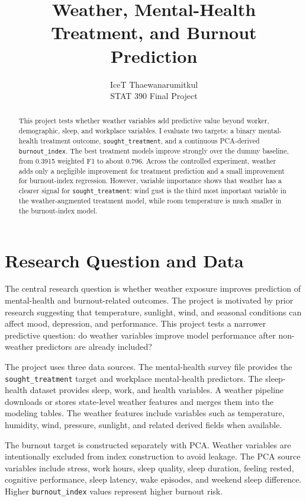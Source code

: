 \documentclass[10pt]{article}
\title{Weather, Mental-Health Treatment, and Burnout Prediction}
\author{IceT Thaewanarumitkul \\ STAT 390 Final Project}
\date{}
\begin{document}
\maketitle

\begin{abstract}
This project tests whether weather variables add predictive value beyond worker, demographic, sleep, and workplace variables. I evaluate two targets: a binary mental-health treatment outcome, \texttt{sought\_treatment}, and a continuous PCA-derived \texttt{burnout\_index}. The best treatment models improve strongly over the dummy baseline, from 0.3915 weighted F1 to about 0.796. Across the controlled experiment, weather adds only a negligible improvement for treatment prediction and a small improvement for burnout-index regression. However, variable importance shows that weather has a clearer signal for \texttt{sought\_treatment}: wind gust is the third most important variable in the weather-augmented treatment model, while room temperature is much smaller in the burnout-index model.
\end{abstract}

\section{Research Question and Data}
The central research question is whether weather exposure improves prediction of mental-health and burnout-related outcomes. The project is motivated by prior research suggesting that temperature, sunlight, wind, and seasonal conditions can affect mood, depression, and performance. This project tests a narrower predictive question: do weather variables improve model performance after non-weather predictors are already included?

The project uses three data sources. The mental-health survey file provides the \texttt{sought\_treatment} target and workplace mental-health predictors. The sleep-health dataset provides sleep, work, and health variables. A weather pipeline downloads or stores state-level weather features and merges them into the modeling tables. The weather features include variables such as temperature, humidity, wind, pressure, sunlight, and related derived fields when available.

The burnout target is constructed separately with PCA. Weather variables are intentionally excluded from index construction to avoid leakage. The PCA source variables include stress, work hours, sleep quality, sleep duration, feeling rested, cognitive performance, sleep latency, wake episodes, and weekend sleep difference. Higher \texttt{burnout\_index} values represent higher burnout risk.
\end{document}
